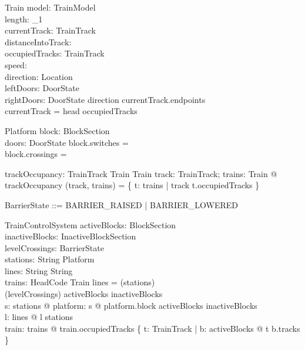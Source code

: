 \begin{zed}
  [String]
\end{zed}

\begin{schema}{Train}
  model: TrainModel\\
  length: \nat _1{}\\
  currentTrack: TrainTrack\\
  distanceIntoTrack: \nat \\
  occupiedTracks: \iseq  TrainTrack\\
  speed: \nat \\
  direction: Location\\
  leftDoors: DoorState\\
  rightDoors: DoorState
\where
  direction \in  currentTrack.endpoints\\
  currentTrack = head occupiedTracks
\end{schema}

\begin{schema}{Platform}
  block: BlockSection\\
  doors: DoorState
\where
  block.switches = \emptyset\\
  block.crossings = \emptyset
\end{schema}

\begin{axdef}
  trackOccupancy: TrainTrack \cross  \finset  Train \fun  \finset  Train
\where
  \forall  track: TrainTrack; trains: \finset  Train @ trackOccupancy (track, trains) = \{  t: trains | track \in  \ran  t.occupiedTracks \}
\end{axdef}

\begin{zed}
BarrierState ::= BARRIER\_RAISED | BARRIER\_LOWERED
\end{zed}

\begin{schema}{TrainControlSystem}
  activeBlocks: \nat  \pinj  BlockSection\\
  inactiveBlocks: \nat  \pinj  InactiveBlockSection\\
  levelCrossings: \finset  \nat  \pfun  BarrierState\\
  stations: String \pinj  \iseq  Platform\\
  lines: String \pinj  \iseq  String\\
  trains: HeadCode \pinj  Train
\where
  \ran  lines = \iseq  (\dom  stations)\\
  \bigcup  (\dom  levelCrossings) \subseteq  \dom  activeBlocks \cup  \dom  inactiveBlocks\\
  \forall  s: \ran  stations @ \forall  platform: \ran  s @ platform.block \in  \ran  activeBlocks \cup  \ran  inactiveBlocks\\
  \forall  l: \ran  lines @ \ran  l \subseteq  \dom  stations\\
  \forall  train: \ran  trains @ \ran  train.occupiedTracks \subseteq  \{  t: TrainTrack | \exists  b: \ran  activeBlocks @ t \in  b.tracks \}
\end{schema}

